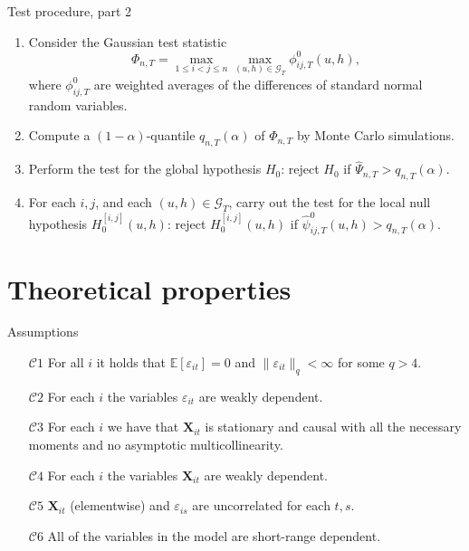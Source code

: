 \documentclass[10pt]{beamer}
\newcommand{\E}{\mathbb{E}}
\newcommand{\X}{\boldsymbol{X}}
\begin{document}
\begin{frame}[label = frame_test]{Test procedure, part 2}

\begin{enumerate}
	\item Consider the Gaussian test statistic 
	\vspace{-2mm} \[ \Phi_{n, T} = \max_{1 \leq i < j \leq n} \max_{(u,h) \in \mathcal{G}_T} \phi^0_{ij, T}(u,h), \] where $\phi^0_{ij, T}$ are weighted averages of the differences of standard normal random variables.\pause
	\item Compute a $(1-\alpha)$-quantile $q_{n, T} (\alpha)$ of $\Phi_{n,T}$ by Monte Carlo simulations.\pause
	\item Perform the test for the global hypothesis $H_0$: reject $H_0$ if $\widehat{\Psi}_{n, T} > q_{n, T}(\alpha)$.\pause
	\item For each $i, j$, and each $(u, h) \in \mathcal{G}_T$, carry out the test for the local null hypothesis $H^{[i,j]}_0(u, h)$: reject $H^{[i,j]}_0(u, h)$ if $\widehat{\psi}^0_{ij, T}(u, h) > q_{n, T}(\alpha)$.
	\end{enumerate}
\end{frame}


\section{Theoretical properties}




\begin{frame}[label = frame_assumptions]{Assumptions}
\begin{itemize}

\item[$\mathcal{C}1$] \label{C-err1} For all $i$ it holds that $\E[\varepsilon_{it}] =0$ and $\| \varepsilon_{it} \|_q < \infty$ for some $q > 4$.\pause
\item[$\mathcal{C}2$] For each $i$ the variables $\varepsilon_{it}$ are weakly dependent. \hyperlink{tech_assumptions}{}\pause

\item[$\mathcal{C}3$] \label{C-reg} For each $i$ we have that $\X_{it}$ is stationary and causal with all the necessary moments and no asymptotic multicollinearity.\pause

\item[$\mathcal{C}4$] For each $i$ the variables $\X_{it}$ are weakly dependent. \hyperlink{tech_assumptions_2}{}\pause
\item[$\mathcal{C}5$]  $\X_{it}$ (elementwise) and $\varepsilon_{is}$ are uncorrelated for each $t, s$.\pause

\item[$\mathcal{C}6$] All of the variables in the model are short-range dependent.\hyperlink{tech_assumptions_3}{}

\end{itemize}
\end{frame}
\end{document}
